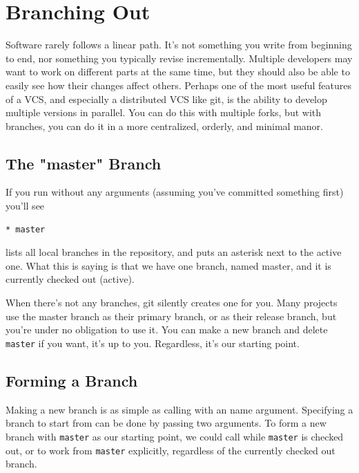 \documentclass[11pt,letterpaper,twoside]{report}
\begin{document}
\chapter{Branching Out}

Software rarely follows a linear path. It's not something you write from
beginning to end, nor something you typically revise incrementally. Multiple
developers may want to work on different parts at the same time, but they should
also be able to easily see how their changes affect others. Perhaps one of the
most useful features of a VCS, and especially a distributed VCS like git, is the
ability to develop multiple versions in parallel. You can do this with multiple
forks, but with branches, you can do it in a more centralized, orderly, and
minimal manor.

\section{The "master" Branch}

If you run  without any arguments (assuming you've committed
something first) you'll see

\begin{lstlisting}[numbers=none]
* master
\end{lstlisting}

 lists all local branches in the repository, and puts an
asterisk next to the active one. What this is saying is that we have one branch,
named master, and it is currently checked out (active).

When there's not any branches, git silently creates one for you. Many projects
use the master branch as their primary branch, or as their release branch, but
you're under no obligation to use it. You can make a new branch and delete
\texttt{master} if you want, it's up to you. Regardless, it's our starting
point.

\section{Forming a Branch}

Making a new branch is as simple as calling  with an name
argument. Specifying a branch to start from can be done by passing two
arguments. To form a new branch with \texttt{master} as our starting point, we
could call  while \texttt{master} is checked
out, or  to work from \texttt{master}
explicitly, regardless of the currently checked out branch.
\end{document}
